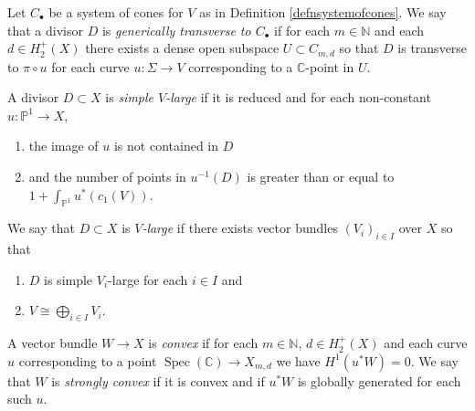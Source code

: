 \documentclass[10pt,a4paper]{amsart}
\newcommand{\Spec}{\operatorname{Spec}}
\newcommand{\bC}{\mathbb{C}}
\newcommand{\bN}{\mathbb{N}}
\newcommand{\bP}{\mathbb{P}}
\newcommand{\calO}{\mathcal{O}}
\begin{document}
\begin{defn} \label{defngenericallytransverse}
	Let $C_\bullet$ be a system of cones for $V$ as in Definition \ref{defnsystemofcones}.
	We say that a divisor $D$ is \emph{generically transverse to $C_\bullet$} if for each $m \in \bN$ and each $d \in H_2^+(X)$ there exists a dense open subspace $U \subset C_{m,d}$ so that $D$ is transverse to $\pi \circ u$ for each curve $u : \Sigma \to V$ corresponding to a $\bC$-point in $U$.

\end{defn}

\begin{defn} \label{defncompactieab}
	A divisor $D \subset X$ is \emph{simple $V$-large} if it is reduced and
	for each non-constant $u : \bP^1 \to X$,
	\begin{enumerate}
		\item the image of $u$ is not contained in $D$
		\item \label{itemprop5}
		      and the number of points in $u^{-1}(D)$ is greater than or equal to $1 + \int_{\bP^1} u^*(c_1(V))$.
	\end{enumerate}
	We say that $D \subset X$ is \emph{$V$-large} if there exists vector bundles $(V_i)_{i \in I}$ over $X$ so that
	\begin{enumerate}
		\item $D$ is simple $V_i$-large for each $i \in I$ and
		\item $V \cong \bigoplus_{i \in I} V_i$.
	\end{enumerate}
\end{defn}

\begin{defn} \label{defnconvex}
	A vector bundle $W \to X$ is \emph{convex} if for each $m \in \bN$, $d \in H_2^+(X)$ and each curve $u$ corresponding to a point $\Spec(\bC) \to X_{m,d}$ we have $H^1(u^*W) = 0$.
	We say that $W$ is \emph{strongly convex} if it is convex and if $u^*W$ is globally generated for each such $u$.
\end{defn}
\end{document}
